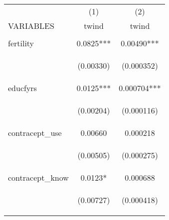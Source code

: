 \documentclass{article}[11pt,subeqn]
\begin{document}
\begin{spacing}{1.25}
\begin{table}[ht]
\begin{center}
\begin{tabular}{lcc} \toprule
  & (1) & (2) \\
 VARIABLES & twind & twind \\ \midrule
 \begin{footnotesize}\end{footnotesize} & \begin{footnotesize}\end{footnotesize} & \begin{footnotesize}\end{footnotesize} \\
 fertility & 0.0825*** & 0.00490*** \\
  \begin{footnotesize}\end{footnotesize} & \begin{footnotesize}(0.00330)\end{footnotesize} & \begin{footnotesize}(0.000352)\end{footnotesize} \\
  educfyrs & 0.0125*** & 0.000704*** \\
  \begin{footnotesize}\end{footnotesize} & \begin{footnotesize}(0.00204)\end{footnotesize} & \begin{footnotesize}(0.000116)\end{footnotesize} \\
  contracept\_use & 0.00660 & 0.000218 \\
  \begin{footnotesize}\end{footnotesize} & \begin{footnotesize}(0.00505)\end{footnotesize} & \begin{footnotesize}(0.000275)\end{footnotesize} \\
  contracept\_know & 0.0123* & 0.000688 \\
  \begin{footnotesize}\end{footnotesize} & \begin{footnotesize}(0.00727)\end{footnotesize} & \begin{footnotesize}(0.000418)\end{footnotesize} \\

\end{tabular}
\end{center}
\end{table}
\end{spacing}
\end{document}

